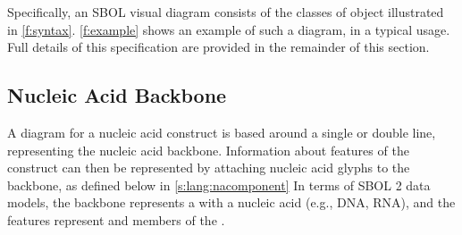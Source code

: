 Specifically, an SBOL visual diagram consists of the classes of object illustrated in \ref{f:syntax}.
\ref{f:example} shows an example of such a diagram, in a typical usage.
Full details of this specification are provided in the remainder of this section.


\subsection{Nucleic Acid Backbone}
\label{s:lang:backbone}

A diagram for a nucleic acid construct is based around a single or double line, representing the nucleic acid backbone. 
Information about features of the construct can then be represented by attaching nucleic acid glyphs to the backbone, as defined below in \ref{s:lang:nacomponent}
%
In terms of SBOL 2 data models, the backbone represents a  with a nucleic acid  (e.g., DNA, RNA), and the features represent  and  members of the .

